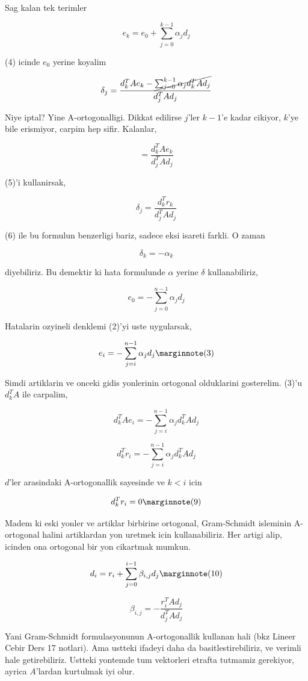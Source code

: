 \documentclass[12pt,fleqn]{article}\usepackage{../common}
\begin{document}
Sag kalan tek terimler 

\[ e_k = e_0 + \sum _{ j=0}^{k-1} \alpha_j d_j \]

(4) icinde $e_0$ yerine koyalim

\[ \delta_j = \frac{ d_k^T A e_k - \cancel{\sum _{ j=0}^{k-1} \alpha_j d_k^T A d_j}}
{ d_j^T A d_j } 
\]

Niye iptal? Yine A-ortogonalligi. Dikkat edilirse $j$'ler $k-1$'e kadar
cikiyor, $k$'ye bile erismiyor, carpim hep sifir. Kalanlar,

\[  = \frac{ d_k^T A e_k}
{ d_j^T A d_j } 
\]

(5)'i kullanirsak, 

\[ \delta_j = \frac{ d_k^T r_k}
{ d_j^T A d_j } 
\]


(6) ile bu formulun benzerligi bariz, sadece eksi isareti farkli. O zaman 

\[ \delta_k = -\alpha_k \]

diyebiliriz. Bu demektir ki hata formulunde $\alpha$ yerine $\delta$
kullanabiliriz, 

\[ e_0 = -\sum _{ j=0}^{n-1} \alpha_j d_j \]

Hatalarin ozyineli denklemi (2)'yi uste uygularsak, 

\[ e_i = -\sum _{ j=i}^{n-1} \alpha_j d_j 
\mlabel{3}
\]

Simdi artiklarin ve onceki gidis yonlerinin ortogonal olduklarini
gosterelim. (3)'u $d_k^TA$ ile carpalim, 

\[ d_k^TAe_i = -\sum _{ j=i}^{n-1} \alpha_j  d_k^TAd_j 
\]

\[ d_k^Tr_i = -\sum _{ j=i}^{n-1} \alpha_j  d_k^TAd_j 
\]

$d$'ler arasindaki A-ortogonallik sayesinde ve $k < i$ icin 

\[ d_k^Tr_i = 0
\mlabel{9}
\]

Madem ki eski yonler ve artiklar birbirine ortogonal, Gram-Schmidt
isleminin A-ortogonal halini artiklardan yon uretmek icin
kullanabiliriz. Her artigi alip, icinden ona ortogonal bir yon cikartmak
mumkun.

\[ d_i = r_i + \sum _{ j=0}^{i-1} \beta_{i,j}d_j 
\mlabel{10}
\]

\[ \beta_{i,j} = - \frac{ r_i^TAd_j}{d_j^TAd_j} \]

Yani Gram-Schmidt formulasyonunun A-ortogonallik kullanan hali (bkz Lineer
Cebir Ders 17 notlari). Ama ustteki ifadeyi daha da basitlestirebiliriz, ve
verimli hale getirebiliriz. Ustteki yontemde tum vektorleri etrafta
tutmamiz gerekiyor, ayrica $A$'lardan kurtulmak iyi olur. 
\end{document}
